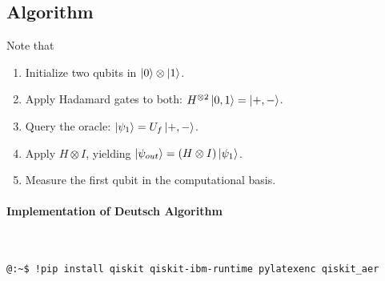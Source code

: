 \newpage
\subsection{Algorithm}
\begin{note}
Note that \begin{enumerate}
	\item Initialize two qubits in $\ket{0}\otimes\ket{1}$.
	\item Apply Hadamard gates to both: $H^{\otimes2}\ket{0,1}=\ket{+,-}$.
	\item Query the oracle: $\ket{\psi_1}=U_f\ket{+,-}$.
	\item Apply $H\otimes I$, yielding $\ket{\psi_{out}}=(H\otimes I)\ket{\psi_1}$.
	\item Measure the first qubit in the computational basis.
\end{enumerate}
\end{note}

\paragraph{Implementation of Deutsch Algorithm}
\ \\
\begin{lstlisting}
@:~$ !pip install qiskit qiskit-ibm-runtime pylatexenc qiskit_aer
\end{lstlisting}

